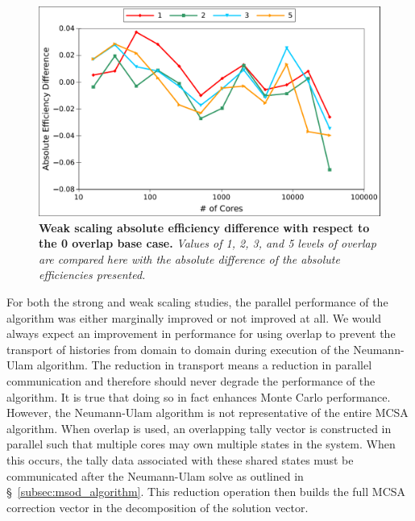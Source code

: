 \begin{figure}[t!]
  \begin{center}
    \includegraphics[width=6in]{chapters/parallel_mc/titan_weak_overlap_diff.pdf}
  \end{center}
  \caption{\textbf{Weak scaling absolute efficiency difference with
      respect to the 0 overlap base case.} \textit{Values of 1, 2, 3,
      and 5 levels of overlap are compared here with the absolute
      difference of the absolute efficiencies presented.}}
  \label{fig:titan_weak_overlap_diff}
\end{figure}

For both the strong and weak scaling studies, the parallel performance
of the algorithm was either marginally improved or not improved at
all. We would always expect an improvement in performance for using
overlap to prevent the transport of histories from domain to domain
during execution of the Neumann-Ulam algorithm. The reduction in
transport means a reduction in parallel communication and therefore
should never degrade the performance of the algorithm. It is true that
doing so in fact enhances Monte Carlo performance. However, the
Neumann-Ulam algorithm is not representative of the entire MCSA
algorithm. When overlap is used, an overlapping tally vector is
constructed in parallel such that multiple cores may own multiple
states in the system. When this occurs, the tally data associated with
these shared states must be communicated after the Neumann-Ulam solve
as outlined in \S~\ref{subsec:msod_algorithm}. This reduction
operation then builds the full MCSA correction vector in the
decomposition of the solution vector. 

